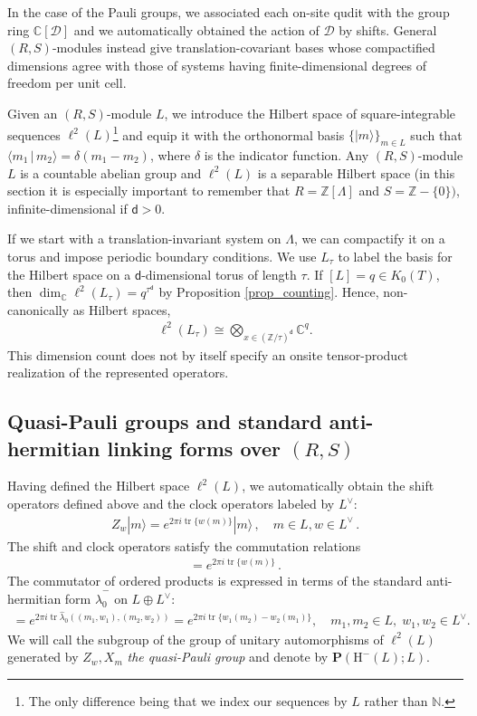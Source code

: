 \documentclass[sn-mathphys-num]{sn-jnl}
\theoremstyle{definition}
\numberwithin{equation}{section}
\theoremstyle{definition}
\def\CD {{\mathcal D}}
\def\CD {{\mathcal D}}
\def\hm{{\mbox{H}}^{-}}
\def\IC{\mathbb{C}}
\def\IZ{{\mathbb{Z}}}
\def\la{\langle}
\def\ra{\rangle}
\def\La{{\Lambda}}
\def\hl{{\hat \lambda}}
\def\tr{\operatorname{tr}}
\newcommand{\dd}{{\mathsf{d}}} %
\begin{document}
In the case of the Pauli groups, we associated each on-site qudit with the group ring $\IC[\CD]$ and we automatically obtained the action of $\CD$ by shifts. General $(R,S)$-modules instead give translation-covariant bases whose compactified dimensions agree with those of systems having finite-dimensional degrees of freedom per unit cell.

Given an $(R,S)$-module $L$, we introduce the Hilbert space of square-integrable sequences $\ell^2(L)$\footnote{The only difference being that we index our sequences by $L$ rather than $\mathbb N$.} and  equip it with the orthonormal basis $\{|m\ra\}_{m\in L}$ such that $\la m_1\,|\,m_2\ra=\delta(m_1-m_2)$, where $\delta$ is the indicator function. Any $(R,S)$-module $L$ is a countable abelian group and $\ell^2(L)$ is a separable Hilbert space (in this section it is especially important to remember that $R=\IZ[\La]$ and $S=\IZ-\{0\})$, infinite-dimensional if $\dd>0$. 

If we start with a translation-invariant system on $\La$, we can compactify it on a torus and impose periodic boundary conditions. We use $L_{\tau}$ to label the basis for the Hilbert space on a $\dd$-dimensional torus of length $\tau$. If $[L]=q\in K_0(T)$, then $\dim_{\IC}\ell^2(L_{\tau})=q^{\tau^{\dd}}$ by Proposition \ref{prop_counting}. Hence, non-canonically as Hilbert spaces, \begin{align} \ell^2(L_{\tau}) \cong \bigotimes_{x\in(\IZ/\tau)^{\dd}}\IC^q. \end{align} This dimension count does not by itself specify an onsite tensor-product realization of the represented operators.

\subsection{Quasi-Pauli groups and standard anti-hermitian linking forms over $(R,S)$}

Having defined the Hilbert space $\ell^2(L)$, we automatically obtain the shift operators defined above
and the clock operators labeled by $L^{\vee}$:
\begin{align}\label{eq:quasi_clock}
    Z_{w}|m\ra=e^{2\pi i \tr \{w(m)\}}|m\ra\,,\quad m\in L,w\in L^{\vee}\,.
\end{align} 
The shift and clock operators satisfy the commutation relations 
\begin{align}
    [Z_w,X_m]=e^{2\pi i \tr \{w(m)\}}\,.
\end{align}
The commutator of ordered products is expressed in terms of the standard anti-hermitian form $\hl_0^{-}$ on $L\oplus L^{\vee}$: 
\begin{align} 
[X_{m_1}Z_{w_1},X_{m_2}Z_{w_2}] = e^{2\pi i\tr\hl_0((m_1,w_1),(m_2,w_2))} = e^{2\pi i\tr\{w_1(m_2)-w_2(m_1)\}}, \quad m_1,m_2\in L,\; w_1,w_2\in L^{\vee}. 
\end{align}
 We will call the subgroup of the group of unitary automorphisms of  $\ell^2(L)$ generated by $Z_w,X_m$  \textit{the quasi-Pauli group} and denote by $\textbf{P}(\hm(L);L)$. 
\end{document}

